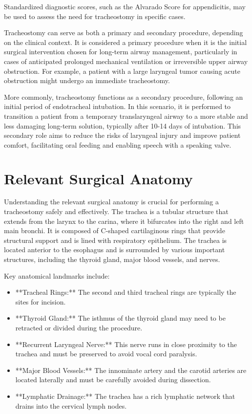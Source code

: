 Standardized diagnostic scores, such as the Alvarado Score for appendicitis, may be used to assess the need for tracheostomy in specific cases.

Tracheostomy can serve as both a primary and secondary procedure, depending on the clinical context. It is considered a primary procedure when it is the initial surgical intervention chosen for long-term airway management, particularly in cases of anticipated prolonged mechanical ventilation or irreversible upper airway obstruction. For example, a patient with a large laryngeal tumor causing acute obstruction might undergo an immediate tracheostomy.

More commonly, tracheostomy functions as a secondary procedure, following an initial period of endotracheal intubation. In this scenario, it is performed to transition a patient from a temporary translaryngeal airway to a more stable and less damaging long-term solution, typically after 10-14 days of intubation. This secondary role aims to reduce the risks of laryngeal injury and improve patient comfort, facilitating oral feeding and enabling speech with a speaking valve.

\section*{Relevant Surgical Anatomy}
Understanding the relevant surgical anatomy is crucial for performing a tracheostomy safely and effectively. The trachea is a tubular structure that extends from the larynx to the carina, where it bifurcates into the right and left main bronchi. It is composed of C-shaped cartilaginous rings that provide structural support and is lined with respiratory epithelium. The trachea is located anterior to the esophagus and is surrounded by various important structures, including the thyroid gland, major blood vessels, and nerves.

Key anatomical landmarks include:

\begin{itemize}
  \item **Tracheal Rings:** The second and third tracheal rings are typically the sites for incision.
  \item **Thyroid Gland:** The isthmus of the thyroid gland may need to be retracted or divided during the procedure.
  \item **Recurrent Laryngeal Nerve:** This nerve runs in close proximity to the trachea and must be preserved to avoid vocal cord paralysis.
  \item **Major Blood Vessels:** The innominate artery and the carotid arteries are located laterally and must be carefully avoided during dissection.
  \item **Lymphatic Drainage:** The trachea has a rich lymphatic network that drains into the cervical lymph nodes.
\end{itemize}

